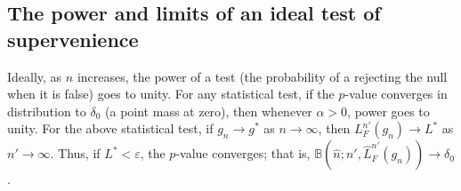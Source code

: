\documentclass{article}
\newcommand{\conv}{\rightarrow}
\newcommand{\PP}{\mathbb{P}}           %
\newcommand{\EE}{\mathbb{E}}           %
\newcommand{\eps}{\varepsilon}
\providecommand{\mh}[1]{\widehat{#1}}
\newcommand{\hL}{\widehat{L}}
\begin{document}
% 
% 
% 

\subsection*{The power and limits of an ideal test of supervenience} %
\label{sub:uc}

Ideally, as $n$ increases, the power of a test (the probability of a rejecting the null when it is false)  goes to unity. For any statistical test, if the $p$-value converges in distribution to $\delta_0$ (a point mass at zero), then whenever $\alpha >0$, power goes to unity.  For the above statistical test, if $g_n \conv g^*$ as $n \conv \infty$, then $L^{n'}_F(g_n) \conv L^*$ as $n' \conv \infty$.  Thus, if $L^* < \eps$, the $p$-value converges; that is, $\mathbb{B}(\mh{n}; n', \hL^{n'}_F(g_n)) \conv \delta_0$.



\end{document}
